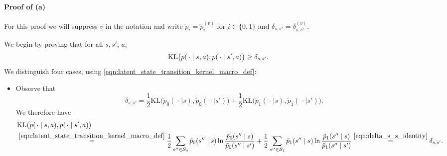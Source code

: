 \documentclass[11pt]{article}
\newcommand{\mcS}{\mathcal{S}}
\newcommand{\KL}{\textnormal{KL}}
\theoremstyle{definition}
\theoremstyle{definition}
\begin{document}
\paragraph{Proof of (a)}

For this proof we will suppress $v$ in the notation and write $\tilde{p}_i = \tilde{p}_i^{(v)}$ for $i\in\{0,1\}$ and $\delta_{s,s'}=\delta^{(v)}_{s,s'}$.

We begin by proving that for all $s, s'$, $a$,
\begin{equation}
	\KL\bigl( p(\,\cdot\mid  s,a), p(\,\cdot\mid  s',a) \bigr)
	\geq
	\delta_{s,s'}
	.
	\label{eqn:KL_ps_psprime_geq_delta}
\end{equation}
We distinguish four cases, using \eqref{eqn:latent_state_transition_kernel_macro_def}:

\begin{itemize}
	\item[$a \neq a^*_s, a^*_{s'}$.]
	      Observe that
	      \begin{equation}
				\delta_{s,s'}
				=
				\frac{1}{2}
				\mathrm{KL}\bigl(
					\tilde{p}_0(\,\cdot\mid  s),\tilde{p}_0(\,\cdot\mid  s')
				\bigr)
				+
				\frac{1}{2}
				\mathrm{KL}\bigl(
					\tilde{p}_1(\,\cdot\mid  s),\tilde{p}_1(\,\cdot\mid  s')
				\bigr)
				.
				\label{eqn:delta_s_s_identity}
	      \end{equation}
	      We therefore have
	      \begin{align}
		       &
		      \KL\bigl( p(\,\cdot\mid  s,a), p(\,\cdot\mid  s',a) \bigr)
		      \\
		       &
		      \overset{\eqref{eqn:latent_state_transition_kernel_macro_def}}{=}
		      \frac{1}{2}
		      \sum_{s''\in\mcS_0}
		      \tilde{p}_0(s'' \mid s)
		      \ln\frac{\tilde{p}_0(s'' \mid s)}{\tilde{p}_0(s'' \mid s')}
		      +
		      \frac{1}{2}
		      \sum_{s''\in\mcS_1}
		      \tilde{p}_1(s'' \mid s)
		      \ln\frac{\tilde{p}_1(s'' \mid s)}{\tilde{p}_1(s'' \mid s')}
		      \overset{\eqref{eqn:delta_s_s_identity}}{=}
		      \delta_{s,s'}
		      .
		      \nonumber
	      \end{align}


\end{itemize}
\end{document}
